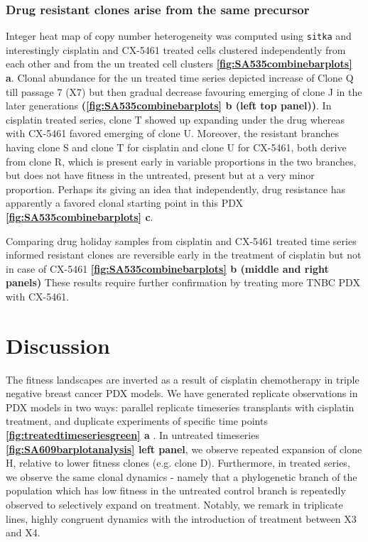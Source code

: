 \subsubsection{Drug resistant clones arise from the same precursor}
Integer heat map of copy number heterogeneity was computed using \texttt{sitka} and interestingly cisplatin and CX-5461 treated cells clustered independently from each other and from the un treated cell clusters \textbf{\autoref{fig:SA535combinebarplots} a}. Clonal abundance for the un treated time series depicted increase of Clone Q till passage 7 (X7) but then gradual decrease favouring emerging of clone J in the later generations \textbf{(\autoref{fig:SA535combinebarplots} b (left top panel))}. In cisplatin treated series, clone T showed up expanding under the drug whereas with CX-5461 favored emerging of clone U.
Moreover, the resistant branches having clone S and clone T for cisplatin and clone U for CX-5461, both derive from clone R, which is present early in variable proportions in the two branches, but does not have fitness in the untreated, present but at a very minor proportion. Perhaps its giving an idea that independently, drug resistance has apparently a favored clonal starting point in this PDX \textbf{\autoref{fig:SA535combinebarplots} c}. 

Comparing drug holiday samples from cisplatin and CX-5461 treated time series informed resistant clones are reversible early in the treatment of cisplatin but not in case of CX-5461 \textbf{\autoref{fig:SA535combinebarplots} b (middle and right panels)}
These results require further confirmation by treating more TNBC PDX with CX-5461.



\section{Discussion}
The fitness landscapes are inverted as a result of cisplatin chemotherapy in  triple negative breast cancer PDX models.  We have generated replicate observations in PDX models in two ways: parallel replicate timeseries transplants with cisplatin treatment, and duplicate experiments of specific time points \textbf{\autoref{fig:treatedtimeseriesgreen} a} . In untreated timeseries \textbf{\autoref{fig:SA609barplotanalysis} left panel}, we observe repeated expansion of clone H, relative to lower fitness clones (e.g. clone D). Furthermore, in treated series, we observe the same clonal dynamics - namely that a phylogenetic branch of the population which has low fitness in the untreated control branch is repeatedly observed to selectively expand on treatment.  Notably, we remark in triplicate lines,  highly congruent dynamics with the introduction of treatment between X3 and X4. 

